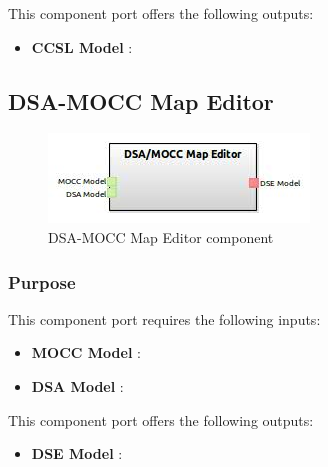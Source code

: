 \documentclass{gemoc} %
\begin{document}

This component port offers the following outputs:
\begin{itemize}
  \item \textbf{CCSL Model} :
\end{itemize}

\subsection{DSA-MOCC Map Editor}

\begin{figure}[htp]
	\begin{center}
	\includegraphics*[trim=0.0cm 0.0cm 0cm 0.0cm, clip=true, scale=1.0]{../images/generated/Generated_DSA-MOCC Map Editor.jpg}
	\caption{DSA-MOCC Map Editor component}
	\end{center}
\end{figure}

\subsubsection{Purpose}

This component port requires the following inputs:
\begin{itemize}
  \item \textbf{MOCC Model} :
  \item \textbf{DSA Model} :
\end{itemize}

This component port offers the following outputs:
\begin{itemize}
  \item \textbf{DSE Model} :
\end{itemize}
\end{document}
